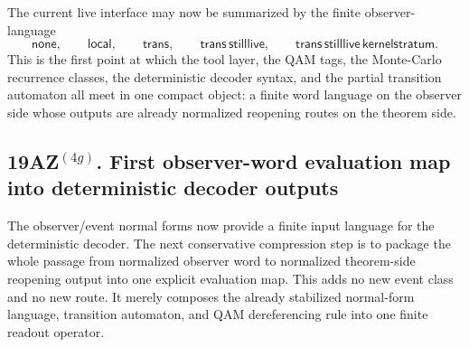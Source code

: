 \begin{remark}
\label{rem:immediate-machine-reading-observer-event-normal-form}
The current live interface may now be summarized by the finite observer-language
\[
\mathsf{none},\qquad
\mathsf{local},\qquad
\mathsf{trans},\qquad
\mathsf{trans}\,\mathsf{stilllive},\qquad
\mathsf{trans}\,\mathsf{stilllive}\,\mathsf{kernelstratum}.
\]
This is the first point at which the tool layer, the QAM tags, the Monte-Carlo recurrence classes, the deterministic decoder syntax, and the partial transition automaton all meet in one compact object: a finite word language on the observer side whose outputs are already normalized reopening routes on the theorem side.
\end{remark}



\subsection*{19AZ$^{(4g)}$. First observer-word evaluation map into deterministic decoder outputs}
\label{sec:first-observer-word-evaluation-map-deterministic-decoder-outputs}
The observer/event normal forms now provide a finite input language for the deterministic decoder. The next conservative compression step is to package the whole passage from normalized observer word to normalized theorem-side reopening output into one explicit evaluation map. This adds no new event class and no new route. It merely composes the already stabilized normal-form language, transition automaton, and QAM dereferencing rule into one finite readout operator.

